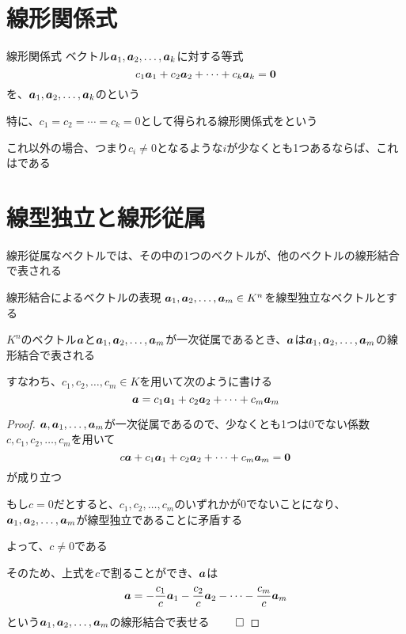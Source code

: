 \documentclass[../../../topic_linear-algebra]{subfiles}
\begin{document}
\sectionline
\section{線形関係式}

\begin{definition}{線形関係式}
  ベクトル$\vb*{a}_1, \vb*{a}_2, \dots, \vb*{a}_k$に対する等式
  \begin{equation*}
    c_1 \vb*{a}_1 + c_2 \vb*{a}_2 + \cdots + c_k \vb*{a}_k = \vb*{0}
  \end{equation*}
  を、$\vb*{a}_1, \vb*{a}_2, \dots, \vb*{a}_k$のという
\end{definition}

特に、$c_1 = c_2 = \cdots = c_k = 0$として得られる線形関係式をという

これ以外の場合、つまり$c_i \neq 0$となるような$i$が少なくとも1つあるならば、これはである

\sectionline
\section{線型独立と線形従属}

線形従属なベクトルでは、その中の1つのベクトルが、他のベクトルの線形結合で表される

\begin{theorem}{線形結合によるベクトルの表現}\label{thm:dep-vec-is-lincomb}
  $\vb*{a}_1, \vb*{a}_2, \dots, \vb*{a}_m \in K^n$を線型独立なベクトルとする

  $K^n$のベクトル$\vb*{a}$と$\vb*{a}_1, \vb*{a}_2, \dots, \vb*{a}_m$が一次従属であるとき、$\vb*{a}$は$\vb*{a}_1, \vb*{a}_2, \dots, \vb*{a}_m$の線形結合で表される

  すなわち、$c_1, c_2, \dots, c_m \in K$を用いて次のように書ける
  \begin{equation*}
    \vb*{a} = c_1 \vb*{a}_1 + c_2 \vb*{a}_2 + \cdots + c_m \vb*{a}_m
  \end{equation*}
\end{theorem}

\begin{proof}
  $\vb*{a}, \vb*{a}_1,\dots, \vb*{a}_m$が一次従属であるので、少なくとも1つは0でない係数$c, c_1, c_2, \dots, c_m$を用いて
  \begin{equation*}
    c \vb*{a} + c_1 \vb*{a}_1 + c_2 \vb*{a}_2 + \cdots + c_m \vb*{a}_m = \vb*{0}
  \end{equation*}
  が成り立つ

  もし$c=0$だとすると、$c_1,c_2,\dots,c_m$のいずれかが0でないことになり、$\vb*{a}_1, \vb*{a}_2, \dots, \vb*{a}_m$が線型独立であることに矛盾する

  よって、$c \neq 0$である

  そのため、上式を$c$で割ることができ、$\vb*{a}$は
  \begin{equation*}
    \vb*{a} = -\frac{c_1}{c} \vb*{a}_1 - \frac{c_2}{c} \vb*{a}_2 - \cdots - \frac{c_m}{c} \vb*{a}_m
  \end{equation*}
  という$\vb*{a}_1, \vb*{a}_2, \dots, \vb*{a}_m$の線形結合で表せる $\qed$
\end{proof}
\end{document}
